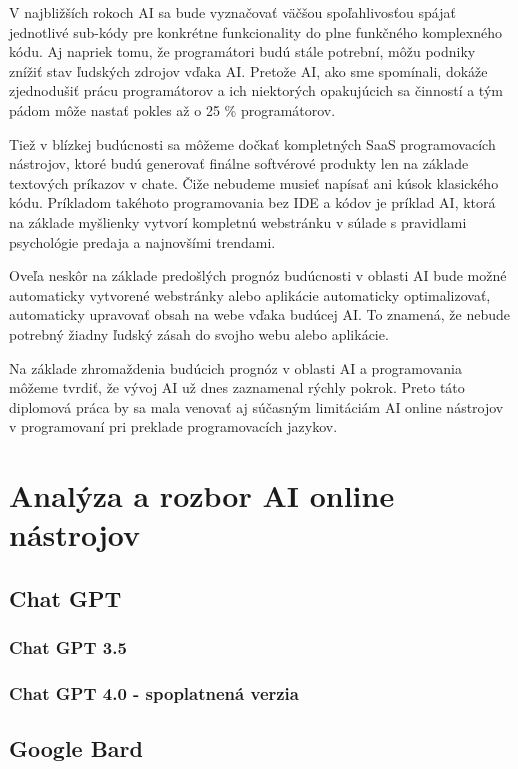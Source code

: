 V najbližších rokoch AI sa bude vyznačovať väčšou spoľahlivosťou spájať jednotlivé sub-kódy pre konkrétne funkcionality do plne funkčného komplexného kódu.  Aj napriek tomu, že programátori budú stále potrební, môžu podniky znížiť stav ľudských zdrojov vďaka AI. Pretože AI, ako sme spomínali, dokáže zjednodušiť prácu programátorov a ich niektorých opakujúcich sa činností a tým pádom môže nastať pokles až o 25 \% programátorov. \cite{dominik_ai_programovanie}
\par Tiež v blízkej budúcnosti sa môžeme dočkať kompletných SaaS programovacích nástrojov, ktoré budú generovať finálne softvérové produkty len na základe textových príkazov v chate.  Čiže nebudeme musieť napísať ani kúsok klasického kódu. Príkladom takéhoto programovania bez IDE a kódov je príklad AI, ktorá na základe myšlienky vytvorí kompletnú webstránku v súlade s pravidlami psychológie predaja a najnovšími trendami. \cite{dominik_ai_programovanie}
\par Oveľa neskôr na základe predošlých prognóz budúcnosti v oblasti AI bude možné automaticky vytvorené webstránky alebo aplikácie automaticky optimalizovať, automaticky upravovať obsah na webe vďaka budúcej AI.  To znamená, že nebude potrebný žiadny ľudský zásah do svojho webu alebo aplikácie. \cite{dominik_ai_programovanie}
\par Na základe zhromaždenia budúcich prognóz v oblasti AI a programovania môžeme tvrdiť, že vývoj AI už dnes zaznamenal rýchly pokrok. Preto táto diplomová práca by sa mala venovať aj súčasným limitáciám AI online nástrojov v programovaní pri preklade programovacích jazykov. \cite{dominik_ai_programovanie}



 
\chapter{Analýza a rozbor AI online nástrojov}
\section{Chat GPT}
\subsection{Chat GPT 3.5}
\subsection{Chat GPT 4.0 - spoplatnená verzia}
\section{Google Bard}
